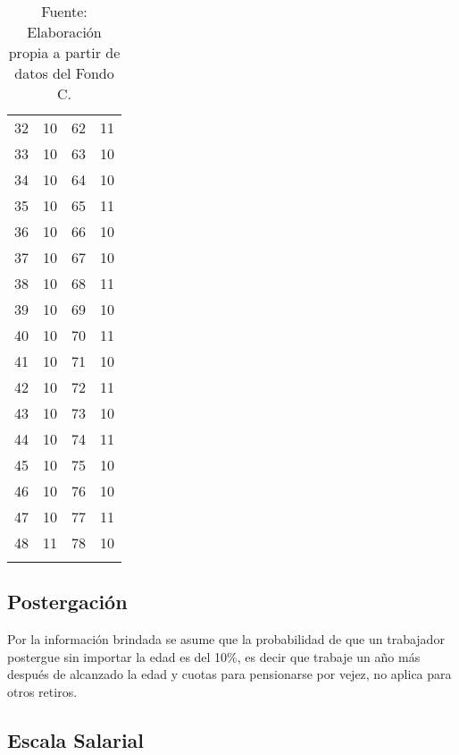\documentclass[
]{article}
\begin{document}
\begin{longtable}{|c|c|c|c|}
  32 & 10 & 62 & 11 \\

  33 & 10 & 63 & 10 \\

  34 & 10 & 64 & 10 \\

  35 & 10 & 65 & 11 \\

  36 & 10 & 66 & 10 \\

  37 & 10 & 67 & 10 \\

  38 & 10 & 68 & 11 \\

  39 & 10 & 69 & 10 \\

  40 & 10 & 70 & 11 \\

  41 & 10 & 71 & 10 \\

  42 & 10 & 72 & 11 \\

  43 & 10 & 73 & 10 \\

  44 & 10 & 74 & 11 \\

  45 & 10 & 75 & 10 \\

  46 & 10 & 76 & 10 \\

  47 & 10 & 77 & 11 \\

  48 & 11 & 78 & 10 \\
  \hline
  
    \caption*{Fuente: Elaboración propia a partir de datos del Fondo C.} 
\end{longtable}

\subsection{Postergación}\label{postergaciuxf3n}

Por la información brindada se asume que la probabilidad de que un
trabajador postergue sin importar la edad es del 10\%, es decir que
trabaje un año más después de alcanzado la edad y cuotas para
pensionarse por vejez, no aplica para otros retiros.

\subsection{Escala Salarial}\label{escala-salarial}
\end{document}
